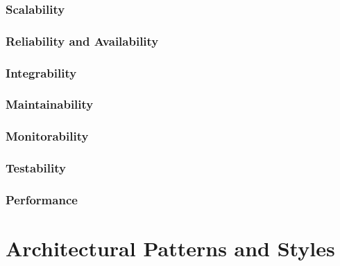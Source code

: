 \documentclass[a4paper,12pt,titlepage]{article}
\begin{document}
		\subsubsection{Scalability}
			
		\subsubsection{Reliability and Availability}
			
		\subsubsection{Integrability}
			



			
		\subsubsection{Maintainability}
			
		\subsubsection{Monitorability}
			
		\subsubsection{Testability}
			
		\subsubsection{Performance}

\section{Architectural Patterns and Styles}
\end{document}
